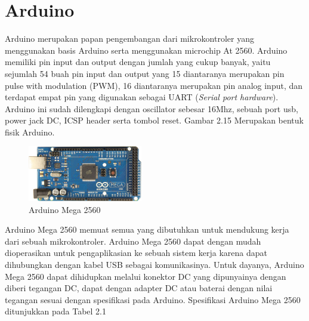 \section{Arduino}
Arduino  merupakan papan pengembangan dari mikrokontroler yang menggunakan basis Arduino serta menggunakan microchip At 2560. Arduino  memiliki pin input dan output dengan jumlah yang cukup banyak, yaitu sejumlah 54 buah pin input dan output yang 15 diantaranya merupakan pin pulse with modulation (PWM), 16 diantaranya merupakan pin analog input, dan terdapat empat pin yang digunakan sebagai UART (\textit{Serial port hardware}). Arduino ini sudah dilengkapi dengan oscillator sebesar 16Mhz, sebuah port usb, power jack DC, ICSP header serta tombol reset. Gambar 2.15 Merupakan bentuk fisik Arduino.
	\begin{figure}[H]
	\centering
	\includegraphics[width=5cm]{gambar/arduino_mega.jpg}
	\caption{Arduino Mega 2560}
\end{figure}

Arduino Mega 2560 memuat semua yang dibutuhkan untuk mendukung kerja dari sebuah mikrokontroler. Arduino Mega 2560 dapat dengan mudah dioperasikan untuk pengaplikasian ke sebuah sistem kerja karena dapat dihubungkan dengan kabel USB sebagai komunikasinya. Untuk dayanya, Arduino Mega 2560 dapat dihidupkan melalui konektor DC yang dipunyainya dengan diberi tegangan DC, dapat dengan adapter DC atau baterai dengan nilai tegangan sesuai dengan spesifikasi pada Arduino. Spesifikasi Arduino Mega 2560 ditunjukkan pada Tabel 2.1
\begin{table}[H]
	\centering
	\caption{ Spesifikasi Arduino Mega 2560 }
\end{table}

